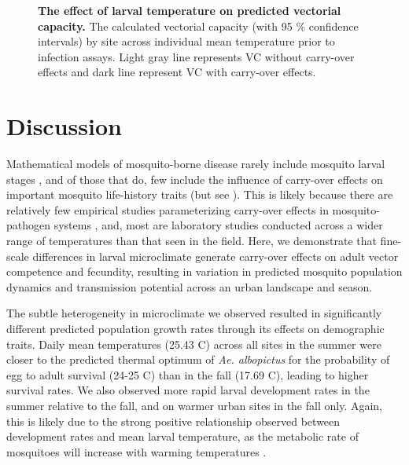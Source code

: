 \documentclass[12pt]{article}
\begin{document}
\begin{figure}
\centering
\caption{\textbf{The effect of larval temperature on predicted vectorial capacity.} The calculated vectorial capacity (with 95 \% confidence intervals) by site across individual mean temperature prior to infection assays. Light gray line represents VC without carry-over effects and dark line represent VC with carry-over effects.}
\label{Fig:VC}
\end{figure}

\section{Discussion}

Mathematical models of mosquito-borne disease rarely include mosquito larval stages \citep{reiner2013}, and of those that do, few include the influence of carry-over effects on important mosquito life-history traits (but see \citep{roux2015a}). This is likely because there are relatively few empirical studies parameterizing carry-over effects in mosquito-pathogen systems \citep{parham2015}, and, most are laboratory studies conducted across a wider range of temperatures than that seen in the field. Here, we demonstrate that fine-scale differences in larval microclimate generate carry-over effects on adult vector competence and fecundity, resulting in variation in predicted mosquito population dynamics and transmission potential across an urban landscape and season.

The subtle heterogeneity in microclimate we observed resulted in significantly different predicted population growth rates through its effects on demographic traits. Daily mean temperatures (25.43 \degree C) across all sites in the summer were closer to the predicted thermal optimum of \textit{Ae. albopictus} for the probability of egg to adult survival (24-25 \degree C) \citep{mordecai2017} than in the fall (17.69 \degree C), leading to higher survival rates. We also observed more rapid larval development rates in the summer relative to the fall, and on warmer urban sites in the fall only. Again, this is likely due to the strong positive relationship observed between development rates and  mean larval temperature, as the metabolic rate of mosquitoes will increase with warming temperatures \citep{delatte2009}.
\end{document}
